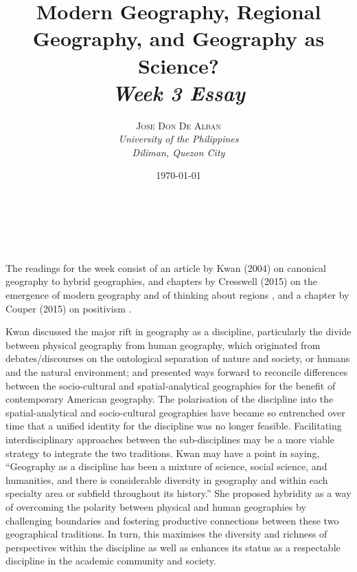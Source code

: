 \documentclass[a4paper, 10.5pt]{article} %
\title{\textbf{Modern Geography, Regional Geography, and Geography as Science?}\\ %
\textsl{Week 3 Essay}} %
\author{\textsc{Jose Don De Alban} %
\\{\textit{University of the Philippines} %
\\{\textit{Diliman, Quezon City}}}} %
\date{\today} %
\makeatletter
\renewcommand{\maketitle}
{
\begin{flushright} %
{\LARGE\@title} %
\vspace{40pt} %

{\large\@author} %
\\\@date %

\vspace{10pt} %
\end{flushright}
}
\makeatother
\begin{document}
\maketitle %


\section*{}

The readings for the week consist of an article by Kwan (2004) \cite{kwan_2004} on canonical geography to hybrid geographies, and chapters by Cresswell (2015) on the emergence of modern geography \cite{cresswell_2013a} and of thinking about regions \cite{cresswell_2013b}, and a chapter by Couper (2015) on positivism \cite{couper_2015}.

Kwan discussed the major rift in geography as a discipline, particularly the divide between physical geography from human geography, which originated from debates/discourses on the ontological separation of nature and society, or humans and the natural environment; and presented ways forward to reconcile differences between the socio-cultural and spatial-analytical geographies for the benefit of contemporary American geography. The polarisation of the discipline into the spatial-analytical and socio-cultural geographies have became so entrenched over time that a unified identity for the discipline was no longer feasible. Facilitating interdisciplinary approaches between the sub-disciplines may be a more viable strategy to integrate the two traditions. Kwan may have a point in saying, \enquote{Geography as a discipline has been a mixture of science, social science, and humanities, and there is considerable diversity in geography and within each specialty area or subfield throughout its history.} She proposed hybridity as a way of overcoming the polarity between physical and human geographies by challenging boundaries and fostering productive connections between these two geographical traditions. In turn, this maximises the diversity and richness of perspectives within the discipline as well as enhances its status as a respectable discipline in the academic community and society.
\end{document}
